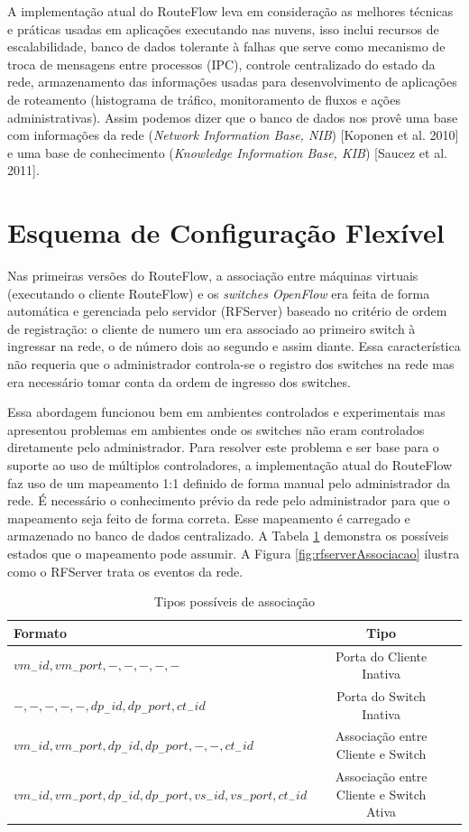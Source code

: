 A implementação atual do RouteFlow leva em consideração
as melhores técnicas e práticas usadas em aplicações executando
nas nuvens, isso inclui recursos de escalabilidade, banco de 
dados tolerante à falhas que serve como mecanismo de troca
de mensagens entre processos (IPC), controle centralizado
do estado da rede, armazenamento das informações usadas 
para desenvolvimento de aplicações de roteamento (histograma 
de tráfico, monitoramento de fluxos e ações administrativas).
Assim podemos dizer que o banco de dados nos provê uma 
base com informações da rede (\textit{Network Information
Base, NIB}) [Koponen et al. 2010] e uma base de conhecimento
 (\textit{Knowledge Information Base, KIB}) [Saucez et al. 2011].

\section{Esquema de Configuração Flexível}

Nas primeiras versões do RouteFlow, a associação entre máquinas
virtuais (executando o cliente RouteFlow) e os \textit{switches OpenFlow}
era feita de forma automática e gerenciada pelo servidor (RFServer) baseado
no critério de ordem de registração: o cliente de numero um
era associado ao primeiro switch à ingressar na rede, o de número
dois ao segundo e assim diante. Essa característica não requeria 
que o administrador controla-se o registro dos switches na rede mas
era necessário tomar conta da ordem de ingresso dos switches.

Essa abordagem funcionou bem em ambientes controlados e 
experimentais mas apresentou problemas em ambientes onde
os switches não eram controlados diretamente pelo administrador.
Para resolver este problema e ser base para o suporte ao uso de
múltiplos controladores, a implementação atual do RouteFlow
faz uso de um mapeamento 1:1 definido de forma manual pelo 
administrador da rede.
É necessário o conhecimento prévio da rede pelo administrador
para que o mapeamento seja feito de forma correta. Esse mapeamento
é carregado e armazenado no banco de dados centralizado.
A Tabela \ref{tab:tipos_associacao} demonstra os possíveis estados que o mapeamento
pode assumir. A Figura \ref{fig:rfserverAssociacao} ilustra como o RFServer trata os eventos
da rede.


\begin{table}[h]
\centering
\begin{tabular}{|l|c|c|}
\hline
Formato & Tipo\\
\hline
\hline
$vm_-id,vm_-port,-,-,-,-,-$ & Porta do Cliente Inativa\\
\hline
$-,-,-,-,-,dp_-id,dp_-port,ct_-id$ & Porta do Switch Inativa\\
\hline
$vm_-id,vm_-port,dp_-id,dp_-port,-,-,ct_-id$ & Associação entre Cliente e Switch\\
\hline
$vm_-id,vm_-port,dp_-id,dp_-port,vs_-id,vs_-port,ct_-id$ & Associação entre Cliente e Switch Ativa\\
\hline
\end{tabular}
\caption{Tipos possíveis de associação}
\label{tab:tipos_associacao}
\end{table}


